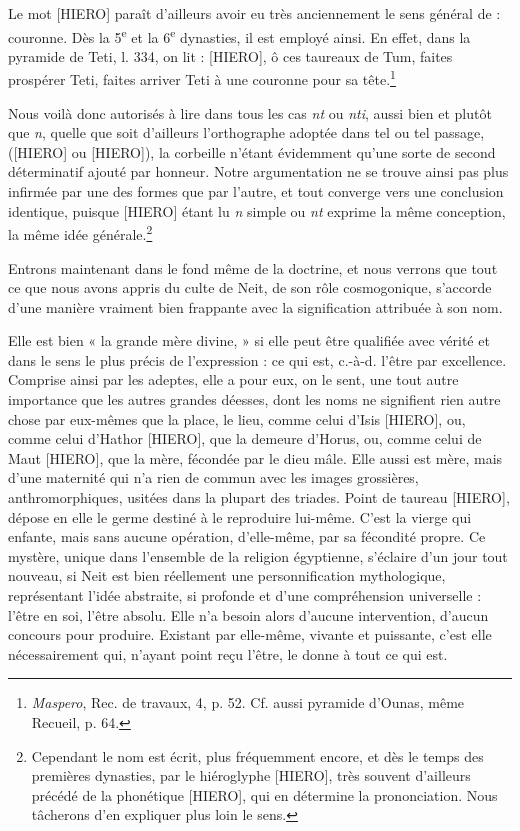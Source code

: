 \documentclass[a4paper, 11pt, oneside]{article}
\begin{document}
Le mot [HIERO] paraît d'ailleurs avoir eu très anciennement le sens général de : couronne. Dès la 5\textsuperscript{e} et la 6\textsuperscript{e} dynasties, il est employé ainsi. En effet, dans la pyramide de Teti, l. 334, on lit : [HIERO], ô ces taureaux de Tum, faites prospérer Teti, faites arriver Teti à une couronne pour sa tête.\footnote{\emph{Maspero}, Rec. de travaux, 4, p. 52. Cf. aussi pyramide d'Ounas, même Recueil, p. 64.}

Nous voilà donc autorisés à lire dans tous les cas \emph{nt} ou \emph{nti}, aussi bien et plutôt que \emph{n}, quelle que soit d'ailleurs l'orthographe adoptée dans tel ou tel passage, ([HIERO] ou [HIERO]), la corbeille n'étant évidemment qu'une sorte de second déterminatif ajouté par honneur. Notre argumentation ne se trouve ainsi pas plus infirmée par une des formes que par l'autre, et tout converge vers une conclusion identique, puisque [HIERO] étant lu \emph{n} simple ou \emph{nt} exprime la même conception, la même idée générale.\footnote{Cependant le nom est écrit, plus fréquemment encore, et dès le temps des premières dynasties, par le hiéroglyphe [HIERO], très souvent d'ailleurs précédé de la phonétique [HIERO], qui en détermine la prononciation. Nous tâcherons d'en expliquer plus loin le sens.}

Entrons maintenant dans le fond même de la doctrine, et nous verrons que tout ce que nous avons appris du culte de Neit, de son rôle cosmogonique, s'accorde d'une manière vraiment bien frappante avec la signification attribuée à son nom.

Elle est bien « la grande mère divine, » si elle peut être qualifiée avec vérité et dans le sens le plus précis de l'expression : ce qui est, c.-à-d. l'être par excellence. Comprise ainsi par les adeptes, elle a pour eux, on le sent, une tout autre importance que les autres grandes déesses, dont les noms ne signifient rien autre chose par eux-mêmes que la place, le lieu, comme celui d'Isis [HIERO], ou, comme celui d'Hathor [HIERO], que la demeure d'Horus, ou, comme celui de Maut [HIERO], que la mère, fécondée par le dieu mâle. Elle aussi est mère, mais d'une maternité qui n'a rien de commun avec les images grossières, anthromorphiques, usitées dans la plupart des triades. Point de taureau [HIERO], dépose en elle le germe destiné à le reproduire lui-même. C'est la vierge qui enfante, mais sans aucune opération, d'elle-même, par sa fécondité propre. Ce mystère, unique dans l'ensemble de la religion égyptienne, s'éclaire d'un jour tout nouveau, si Neit est bien réellement une personnification mythologique, représentant l'idée abstraite, si profonde et d'une compréhension universelle : l'être en soi, l'être absolu. Elle n'a besoin alors d'aucune intervention, d'aucun concours pour produire. Existant par elle-même, vivante et puissante, c'est elle nécessairement qui, n'ayant point reçu l'être, le donne à tout ce qui est.
\end{document}
